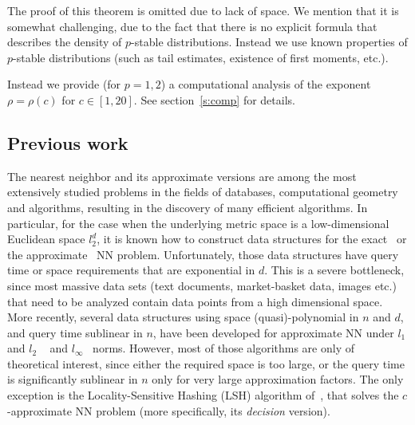 \documentclass[12pt]{article}
\begin{document}
The proof of this theorem is omitted due to lack of space. 
We mention that it is somewhat challenging, due to the fact that there is no explicit formula that describes the density of $p$-stable distributions. Instead we use known properties of $p$-stable distributions (such as tail estimates, existence of first moments, etc.).

Instead we provide (for $p=1,2$) a computational analysis of the exponent 
$\rho=\rho(c)$ for $c \in [1,20]$.
See section~\ref{s:comp} for details.

\fi

\iffalse
\subsection{Previous work}


The nearest neighbor and its approximate versions are among the most extensively studied problems 
in the fields of databases, computational geometry and algorithms, resulting in the
discovery of
many  efficient algorithms.
In particular, for the case when the underlying metric space  is a low-dimensional
Euclidean space $l_2^d$, 
it is known how to construct data structures for the exact~\cite{Cl1,Me} or
the approximate~\cite{AMNSW,Kl,IM,KOR,HP} NN problem.
Unfortunately, those data structures have query time or space requirements
that are exponential in $d$. This is a severe bottleneck, since most
massive data sets (text documents, market-basket data, images etc.) that
need to be analyzed contain data points from a high
dimensional space. 
More recently, several data structures using space (quasi)-polynomial in $n$ and $d$, 
and query time 
sublinear in $n$, have been developed for approximate NN under $l_1$ and
$l_2$ ~\cite{KOR,IM} and $l_{\infty}$~\cite{I98} norms.
However, most of those algorithms are only of theoretical interest, 
since either the required space is too large, or the query time is significantly 
sublinear in $n$ only for very large approximation factors.
The only exception is the Locality-Sensitive Hashing (LSH) algorithm of~\cite{IM}, 
that solves the $c$-approximate NN problem (more specifically, its {\em decision} version).
\end{document}
